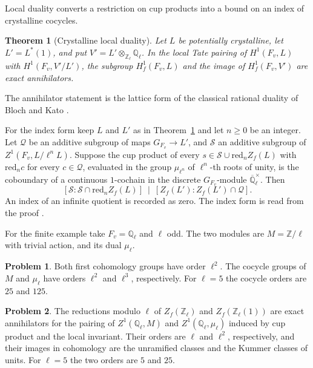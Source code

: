 \documentclass[reqno]{amsart}
\theoremstyle{definition}
\newtheorem{problem}{Problem}[section]
\theoremstyle{plain}
\newtheorem{theorem}{Theorem}[section]
\theoremstyle{remark}
\newcommand{\Z}{\mathbb Z}
\newcommand{\Q}{\mathbb Q}
\begin{document}
Local duality converts a restriction on cup products into a bound on an index
of crystalline cocycles.

\begin{theorem}[Crystalline local duality]\label{thm:duality}
Let \(L\) be potentially crystalline, let \(L'=L^*(1)\), and put
\(V'=L'\otimes_{\Z_\ell}\Q_\ell\).
In the local Tate pairing of \(H^1(F_v,L)\) with \(H^1(F_v,V'/L')\),
the subgroup \(H^1_f(F_v,L)\) and the image of \(H^1_f(F_v,V')\) are
exact annihilators.
\end{theorem}

The annihilator statement is the lattice form of the classical rational
duality of Bloch and Kato \cite[Proposition~3.8]{BK}.

For the index form keep \(L\) and \(L'\) as in Theorem~\ref{thm:duality}
and let \(n\ge 0\) be an integer. Let \(\mathcal Q\) be an additive
subgroup of maps \(G_{F_v}\to L'\), and \(\mathcal S\) an additive subgroup
of \(Z^1(F_v,L/\ell^n L)\). Suppose the cup product of every
\(s\in\mathcal S\cup\mathrm{red}_n Z_f(L)\) with \(\mathrm{red}_n c\) for
every \(c\in\mathcal Q\), evaluated in the group \(\mu_{\ell^n}\) of
\(\ell^n\)-th roots of unity, is the coboundary of a continuous \(1\)-cochain
in the discrete \(G_{F_v}\)-module \(\overline{\Q}_\ell^\times\). Then
\[
  [\mathcal S:\mathcal S\cap \mathrm{red}_n Z_f(L)]
  \ \mid\ [Z_f(L'):Z_f(L')\cap\mathcal Q] .
\]
An index of an infinite quotient is recorded as zero.
The index form is read from the proof \cite{GL}.

For the finite example take \(F_v=\Q_\ell\) and \(\ell\) odd. The two
modules are \(M=\Z/\ell\) with trivial action, and its dual \(\mu_\ell\).

\begin{problem}\label{pr:finite-counts}
Both first cohomology groups have order \(\ell^2\). The cocycle groups
of \(M\) and \(\mu_\ell\) have orders \(\ell^2\) and \(\ell^3\),
respectively. For \(\ell=5\) the cocycle orders are \(25\) and \(125\).
\end{problem}

\begin{problem}\label{pr:finite-annihilators}
The reductions modulo \(\ell\) of \(Z_f(\Z_\ell)\) and \(Z_f(\Z_\ell(1))\)
are exact annihilators for the pairing of \(Z^1(\Q_\ell,M)\) and
\(Z^1(\Q_\ell,\mu_\ell)\) induced by cup product and the local invariant.
Their orders are \(\ell\) and \(\ell^2\), respectively, and their images in
cohomology are the unramified classes and the Kummer classes of units.
For \(\ell=5\) the two orders are \(5\) and \(25\).
\end{problem}
\end{document}

